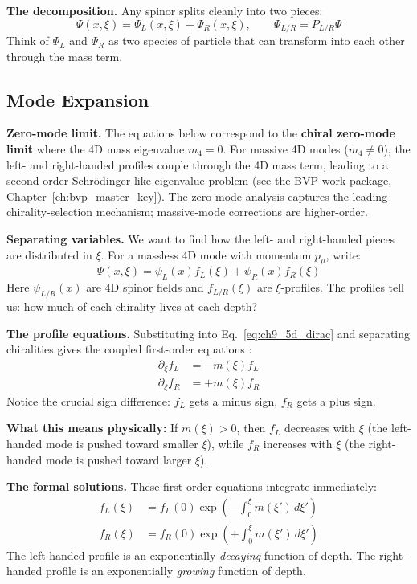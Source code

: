 \textbf{The decomposition.} Any spinor splits cleanly into two pieces:
\begin{equation}
    \Psi(x,\xi) = \Psi_L(x,\xi) + \Psi_R(x,\xi), \qquad \Psi_{L/R} = P_{L/R} \Psi
    \label{eq:ch9_decomposition}
\end{equation}
Think of $\Psi_L$ and $\Psi_R$ as two species of particle that can transform into
each other through the mass term.

\subsection{Mode Expansion}

\textbf{Zero-mode limit.} The equations below correspond to the \textbf{chiral
zero-mode limit} where the 4D mass eigenvalue $m_4 = 0$. For massive 4D modes
($m_4 \neq 0$), the left- and right-handed profiles couple through the 4D mass
term, leading to a second-order Schrödinger-like eigenvalue problem (see the
BVP work package, Chapter~\ref{ch:bvp_master_key}). The zero-mode analysis captures the leading
chirality-selection mechanism; massive-mode corrections are higher-order.

\medskip
\textbf{Separating variables.} We want to find how the left- and right-handed
pieces are distributed in $\xi$. For a massless 4D mode with momentum $p_\mu$, write:
\begin{equation}
    \Psi(x,\xi) = \psi_L(x) f_L(\xi) + \psi_R(x) f_R(\xi)
    \label{eq:ch9_mode_expansion}
\end{equation}
Here $\psi_{L/R}(x)$ are 4D spinor fields and $f_{L/R}(\xi)$ are $\xi$-profiles.
The profiles tell us: how much of each chirality lives at each depth?

\textbf{The profile equations.} Substituting into Eq.~\eqref{eq:ch9_5d_dirac} and
separating chiralities gives the coupled first-order equations \tagBL{}:
\begin{align}
    \partial_\xi f_L &= -m(\xi) f_L \label{eq:ch9_fL_eq} \\
    \partial_\xi f_R &= +m(\xi) f_R \label{eq:ch9_fR_eq}
\end{align}
Notice the crucial sign difference: $f_L$ gets a minus sign, $f_R$ gets a plus sign.

\textbf{What this means physically:} If $m(\xi) > 0$, then $f_L$ decreases with $\xi$
(the left-handed mode is pushed toward smaller $\xi$), while $f_R$ increases with $\xi$
(the right-handed mode is pushed toward larger $\xi$).

\textbf{The formal solutions.} These first-order equations integrate immediately:
\begin{align}
    f_L(\xi) &= f_L(0) \exp\left(-\int_0^\xi m(\xi') \, d\xi'\right) \label{eq:ch9_fL_sol} \\
    f_R(\xi) &= f_R(0) \exp\left(+\int_0^\xi m(\xi') \, d\xi'\right) \label{eq:ch9_fR_sol}
\end{align}
The left-handed profile is an exponentially \emph{decaying} function of depth.
The right-handed profile is an exponentially \emph{growing} function of depth.

